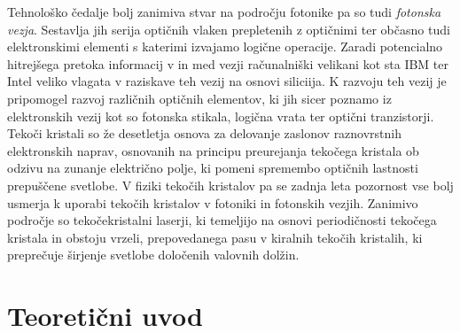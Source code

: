 \documentclass[longbibliography,slovene,a4paper,12pt]{book}
\begin{document}
Tehnološko čedalje bolj zanimiva stvar na področju fotonike pa so tudi \emph{fotonska vezja}. Sestavlja jih serija optičnih vlaken prepletenih z optičnimi ter občasno tudi elektronskimi elementi s katerimi izvajamo logične operacije\cite{siliconphotonics}. Zaradi potencialno hitrejšega pretoka informacij v in med vezji računalniški velikani kot sta IBM ter Intel veliko vlagata v raziskave teh vezij na osnovi siliciija\cite{siliconphotonicsintel}. K razvoju teh vezij je pripomogel razvoj različnih optičnih elementov, ki jih sicer poznamo iz elektronskih vezij kot so fotonska stikala\cite{bose}, logična vrata\cite{espinosa} ter optični tranzistorji\cite{chen}.\\

Tekoči kristali so že desetletja osnova za delovanje zaslonov raznovrstnih elektronskih naprav, osnovanih na principu preurejanja tekočega kristala ob odzivu na zunanje električno polje, ki pomeni spremembo optičnih lastnosti prepuščene svetlobe\cite{yeh}. V fiziki tekočih kristalov pa se zadnja leta pozornost vse bolj usmerja k uporabi tekočih kristalov v fotoniki in fotonskih vezjih\cite{musevic}. Zanimivo področje so tekočekristalni laserji, ki temeljijo na osnovi periodičnosti tekočega kristala in obstoju vrzeli, prepovedanega pasu v kiralnih tekočih kristalih, ki preprečuje širjenje svetlobe določenih valovnih dolžin\cite{coles2}. 

\chapter{Teoretični uvod}
\end{document}
